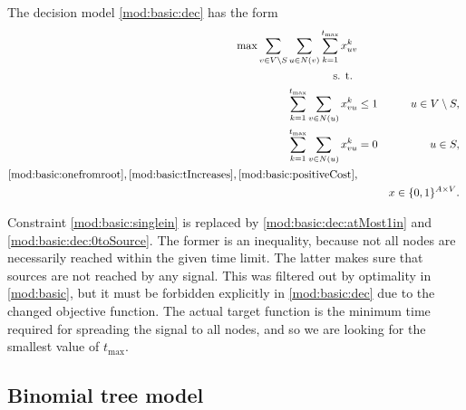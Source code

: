 The decision model \ref{mod:basic:dec}  has the form
\begin{subequations}\label{mod:basic:dec}
\begin{align}
\label{mod:basic:dec:obj} \max \sum\limits_{v \in V\setminus S}\sum\limits_{u \in N(v)} \sum\limits_{k=1}^{t_{\text{max}}}x_{uv}^k \\ 
\notag \text{s. t. } \\
\label{mod:basic:dec:atMost1in} \sum\limits_{k=1}^{t_{\text{max}}}\sum\limits_{v\in N(u)}x_{vu}^k & \leq 1 & u\in V \setminus S,\\
\label{mod:basic:dec:0toSource} \sum\limits_{k=1}^{t_{\text{max}}}\sum\limits_{v\in N(u)}x_{vu}^k & = 0  & u\in S,\\
\notag \eqref{mod:basic:onefromroot}, \eqref{mod:basic:tIncreases}, \eqref{mod:basic:positiveCost},\\
\label{mod:basic:dec:dim}&&x \in \{0,1\}^{A\times V}.
\end{align}~
\end{subequations}

Constraint \eqref{mod:basic:singlein} is replaced by \eqref{mod:basic:dec:atMost1in} and \eqref{mod:basic:dec:0toSource}. 
The former is an inequality, because not all nodes are necessarily reached within the given time limit.
The latter makes sure that sources are not reached by any signal. 
This was filtered out by optimality in \eqref{mod:basic}, but it must be forbidden explicitly in \eqref{mod:basic:dec} due to the changed objective function.
The actual target function is the minimum time required for spreading the signal to all nodes, and so we are looking for the smallest value of $t_{\text{max}}$.
\subsection{Binomial tree model}

